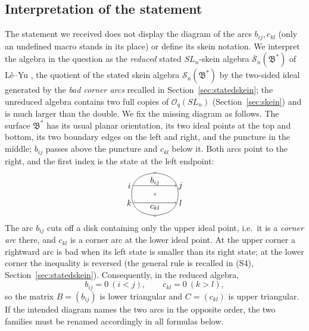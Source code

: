 \documentclass[11pt]{article}
\theoremstyle{remark}
\newcommand{\Skein}{\mathcal S_n}
\newcommand{\redS}{\overline{\mathcal S}_n}
\newcommand{\Bstar}{\mathfrak B^*}
\newcommand{\Oq}{\mathcal O_q(SL_n)}
\begin{document}
\subsection{Interpretation of the statement}\label{sec:interp}

The statement we received does not display the diagram of the arcs
$b_{ij},c_{kl}$ (only an undefined macro stands in its place) or
define its skein notation. We interpret the algebra in the question as
the \emph{reduced} stated $SL_n$-skein algebra $\redS(\Bstar)$ of
L\^e--Yu \cite[Section 7.1]{LY}, the quotient of the stated skein
algebra $\Skein(\Bstar)$ by the two-sided ideal generated by the
\emph{bad corner arcs} recalled in Section~\ref{sec:statedskein}; the
unreduced algebra contains two full copies of $\Oq$
(Section~\ref{sec:skein}) and is much larger than the double.
We fix the missing diagram as follows. The surface $\Bstar$ has its
usual planar orientation, its two ideal points at the top and bottom,
its two boundary edges on the left and right, and the puncture in the
middle; $b_{ij}$ passes above the puncture and $c_{kl}$ below it. Both
arcs point to the right, and the first index is the state at the left
endpoint:
\[
\begin{tikzpicture}[baseline=0,scale=0.6]
  \draw (-1.65,0) .. controls (-1.65,1.25) and (-0.7,1.4) .. (0,1.5);
  \draw (0,1.5) .. controls (0.7,1.4) and (1.65,1.25) .. (1.65,0);
  \draw (-1.65,0) .. controls (-1.65,-1.25) and (-0.7,-1.4) .. (0,-1.5);
  \draw (0,-1.5) .. controls (0.7,-1.4) and (1.65,-1.25) .. (1.65,0);
  \filldraw[fill=white] (0,1.5) circle (0.06);
  \filldraw[fill=white] (0,-1.5) circle (0.06);
  \filldraw[fill=white] (0,0) circle (0.065);
  \draw[->] (-1.52,0.6) -- (1.52,0.6);
  \draw[->] (-1.52,-0.6) -- (1.52,-0.6);
  \node at (-1.82,0.6) {$i$};
  \node at (1.82,0.6) {$j$};
  \node at (-1.82,-0.6) {$k$};
  \node at (1.82,-0.6) {$l$};
  \node at (0,0.91) {$b_{ij}$};
  \node at (0,-0.91) {$c_{kl}$};
\end{tikzpicture}
\]
The arc $b_{ij}$ cuts off a disk containing only the upper ideal
point, i.e.\ it is a \emph{corner arc} there, and $c_{kl}$ is a corner
arc at the lower ideal point. At the upper corner a rightward arc
is bad when its left state is smaller than its right state; at the
lower corner the inequality is reversed (the general rule is recalled
in (S4), Section~\ref{sec:statedskein}). Consequently, in the reduced
algebra,
\[
 b_{ij}=0\ (i<j),\qquad c_{kl}=0\ (k>l),
\]
so the matrix $B=(b_{ij})$ is lower triangular and $C=(c_{kl})$ is
upper triangular. If the intended diagram names the two arcs in the
opposite order, the two families must be renamed accordingly in all
formulas below.
\end{document}

